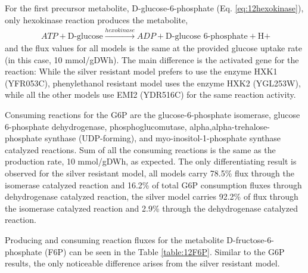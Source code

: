 For the first precursor metabolite, D-glucose-6-phosphate (Eq. \ref{eq:12hexokinase}), only hexokinase reaction produces the metabolite,
\begin{align}
\label{eq:12hexokinase}
\ ATP + \text{D-glucose} \xrightarrow{hexokinase} ADP + \text{D-glucose 6-phosphate} + \text{H+}
\end{align}
and the flux values for all models is the same at the provided glucose uptake rate (in this case, 10 mmol/gDWh). The main difference is the activated gene for the reaction: While the silver resistant model prefers to use the enzyme HXK1 (YFR053C), phenylethanol resistant model uses the enzyme HXK2 (YGL253W), while all the other models use EMI2 (YDR516C) for the same reaction activity.

Consuming reactions for the G6P are the glucose-6-phosphate isomerase, glucose 6-phosphate dehydrogenase, phosphoglucomutase, alpha,alpha-trehalose-phosphate synthase (UDP-forming), and myo-inositol-1-phosphate synthase catalyzed reactions. Sum of all the consuming reactions is the same as the production rate, 10 mmol/gDWh, as expected. The only differentiating result is observed for the silver resistant model, all models carry 78.5\% flux through the isomerase catalyzed reaction and 16.2\% of total G6P consumption fluxes through dehydrogenase catalyzed reaction, the silver model carries 92.2\% of flux through the isomerase catalyzed reaction and 2.9\% through the dehydrogenase catalyzed reaction.

Producing and consuming reaction fluxes for the metabolite D-fructose-6-phosphate (F6P) can be seen in the Table \ref{table:12F6P}. Similar to the G6P results, the only noticeable difference arises from the silver resistant model.

